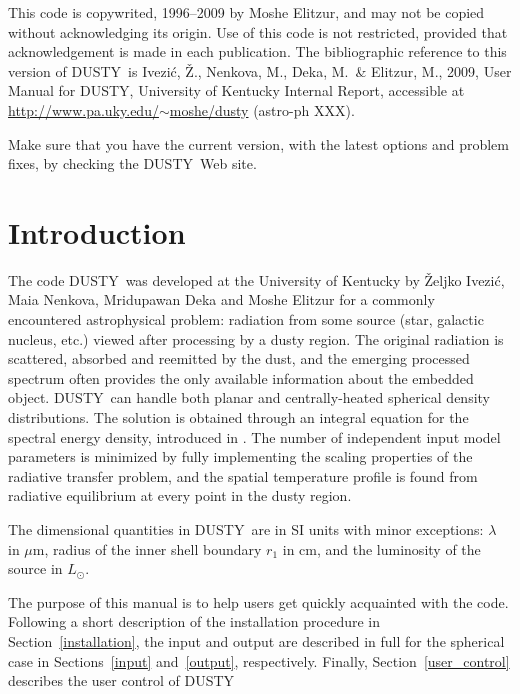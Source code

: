 \documentclass[11pt]{article}
\def\D  {{\sf DUSTY}}
\def\mic    {\hbox{$\mu$m}}
\def\Ivezic {Ivezi\'c}
\begin{document}
\newpage

\thispagestyle{empty}

This code is copywrited, 1996--2009 by Moshe Elitzur, and may not be copied
without acknowledging its origin. Use of this code is not restricted, provided
that acknowledgement is made in each publication.  The bibliographic reference
to this version of \D\ is \Ivezic, \v Z., Nenkova, M., Deka, M.\ \& Elitzur,
M., 2009, User Manual for \D, University of Kentucky Internal Report,
accessible at \href{http://www.pa.uky.edu/~moshe/dusty}
{http://www.pa.uky.edu/$\sim$moshe/dusty} (astro-ph XXX).

Make sure that you have the current version, with the latest options and
problem fixes, by checking the \D\ Web site.

\newpage

 \setcounter{page}{1}

{\large\tableofcontents}


\section{Introduction}
\label{Introduction}

The code \D\ was developed at the University of Kentucky by \v Zeljko \Ivezic,
Maia Nenkova, Mridupawan Deka and Moshe Elitzur for a commonly encountered
astrophysical problem: radiation from some source (star, galactic nucleus,
etc.) viewed after processing by a dusty region. The original radiation is
scattered, absorbed and reemitted by the dust, and the emerging processed
spectrum often provides the only available information about the embedded
object. \D\ can handle both planar and centrally-heated spherical density
distributions.  The solution is obtained through an integral equation for the
spectral energy density, introduced in \cite{IE97}. The number of independent
input model parameters is minimized by fully implementing the scaling
properties of the radiative transfer problem, and the spatial temperature
profile is found from radiative equilibrium at every point in the dusty region.

The dimensional quantities in \D\ are in SI units with minor exceptions:
$\lambda$ in \mic, radius of the inner shell boundary $r_1$ in cm, and the
luminosity of the source in $L_\odot$.

The purpose of this manual is to help users get quickly acquainted with the
code. Following a short description of the installation procedure in
Section~\ref{installation},  the input and output are described in full for the
spherical case in Sections~\ref{input} and~\ref{output}, respectively. Finally,
Section~\ref{user_control} describes the user control of \D
\end{document}
